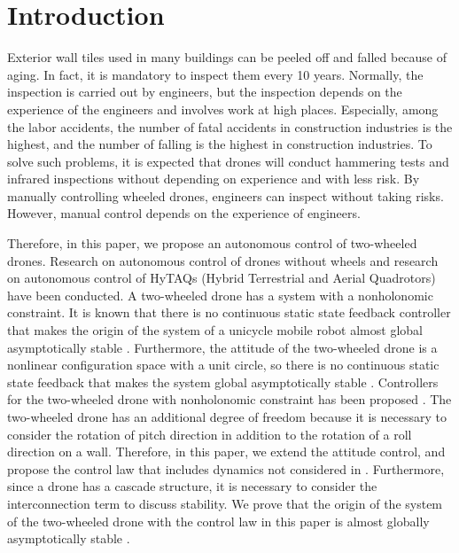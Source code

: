 \section{Introduction}
Exterior wall tiles used in many buildings can be peeled off and falled because of aging.
In fact, it is mandatory to inspect them every 10 years.
Normally, the inspection is carried out by engineers, but the inspection depends on the experience of the engineers and involves work at high places.
Especially, among the labor accidents, the number of fatal accidents in construction industries is the highest, and the number of falling is the highest in construction industries.
To solve such problems, it is expected that drones will conduct hammering tests and infrared inspections without depending on experience and with less risk.
By manually controlling wheeled drones, engineers can inspect without taking risks.   
However, manual control depends on the experience of engineers.

Therefore, in this paper, we propose an autonomous control of two-wheeled drones.
Research on autonomous control of drones without wheels \cite{kooijmanTrajectoryTrackingQuadrotors2019, leeControlComplexManeuvers2011a, leeGeometricTrackingControl2010} and research on autonomous control of HyTAQs (Hybrid Terrestrial and Aerial Quadrotors) \cite{fanAutonomousHybridGround2019, kalantariDesignExperimentalValidation2013, wuMotionPlanningHyTAQs2022} have been conducted.
A two-wheeled drone has a system with a nonholonomic constraint.
It is known that there is no continuous static state feedback controller that makes the origin of the system of a unicycle mobile robot almost global asymptotically stable \cite{brockett1983asymptotic}.  
Furthermore, the attitude of the two-wheeled drone is a nonlinear configuration space with a unit circle, so there is no continuous static state feedback that makes the system global asymptotically stable \cite{sanjay2000topological}.
Controllers for the two-wheeled drone with nonholonomic constraint has been proposed \cite{rodriguez-cortesNewGeometricTrajectory2022}.
The two-wheeled drone has an additional degree of freedom because it is necessary to consider the rotation of pitch direction in addition to the rotation of a roll direction on a wall.
Therefore, in this paper, we extend the attitude control, and propose the control law that includes dynamics not considered in \cite{rodriguez-cortesNewGeometricTrajectory2022}.
Furthermore, since a drone has a cascade structure, it is necessary to consider the interconnection term \cite{lee2013nonlinear} to discuss stability.
We prove that the origin of  the system of the two-wheeled drone with the control law in this paper is almost globally asymptotically stable \cite{angeli2001almost}.

